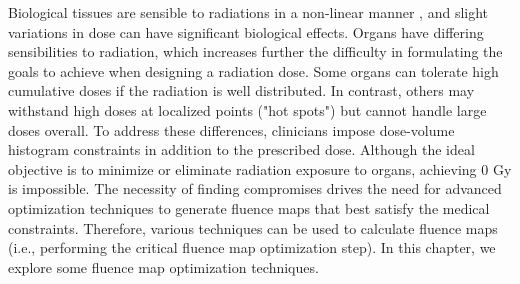 Biological tissues are sensible to radiations in a non-linear manner \cite{Liu2003}, and slight variations in dose can have significant biological effects.
Organs have differing sensibilities to radiation, which increases further the difficulty in formulating the goals to achieve when designing a radiation dose.
Some organs can tolerate high cumulative doses if the radiation is well distributed.
In contrast, others may withstand high doses at localized points ("hot spots") but cannot handle large doses overall.
To address these differences, clinicians impose dose-volume histogram constraints in addition to the prescribed dose.
Although the ideal objective is to minimize or eliminate radiation exposure to organs, achieving 0 Gy is impossible.
The necessity of finding compromises drives the need for advanced optimization techniques to generate fluence maps that best satisfy the medical constraints.
Therefore, various techniques can be used to calculate fluence maps (i.e., performing the critical fluence map optimization step).
In this chapter, we explore some fluence map optimization techniques.
